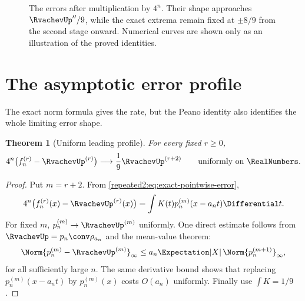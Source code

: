 \documentclass[11pt,oneside]{article}
\newtheorem{theorem}{Theorem}[section]
\theoremstyle{definition}
\theoremstyle{remark}
\begin{document}
\begin{figure}[htbp]
\caption{The errors after multiplication by $4^n$.  Their shape approaches $\RvachevUp''/9$, while
the exact extrema remain fixed at $\pm8/9$ from the second stage onward.  Numerical curves are
shown only as an illustration of the proved identities.}
\label{repeated2:fig:scaled-errors-supplement}
\end{figure}


\section{The asymptotic error profile}
\label{repeated2:sec:asymptotic-profile}

The exact norm formula gives the rate, but the Peano identity also identifies the whole
limiting error shape.

\begin{theorem}[Uniform leading profile]
\label{repeated2:thm:leading-profile}
For every fixed $r\ge0$,
\begin{equation}
 4^n\bigl(f_n^{(r)}-\RvachevUp^{(r)}\bigr)
 \longrightarrow \frac19\RvachevUp^{(r+2)}
 \qquad\text{uniformly on }\RealNumbers.
 \label{repeated2:eq:leading-profile}
\end{equation}
\end{theorem}

\begin{proof}
Put $m=r+2$.  From \eqref{repeated2:eq:exact-pointwise-error},
\[
 4^n\bigl(f_n^{(r)}(x)-\RvachevUp^{(r)}(x)\bigr)
 =\int K(t)p_n^{(m)}(x-a_nt)\Differential t.
\]
For fixed $m$, $p_n^{(m)}\to\RvachevUp^{(m)}$ uniformly.  One direct estimate follows from
$\RvachevUp=p_n\conv\rho_{a_n}$ and the mean-value theorem:
\[
 \Norm{p_n^{(m)}-\RvachevUp^{(m)}}_\infty
 \le a_n\Expectation|X|\,\Norm{p_n^{(m+1)}}_\infty,
\]
for all sufficiently large $n$.  The same derivative bound shows that replacing
$p_n^{(m)}(x-a_nt)$ by $p_n^{(m)}(x)$ costs $O(a_n)$ uniformly.  Finally use
$\int K=1/9$.
\end{proof}
\end{document}
